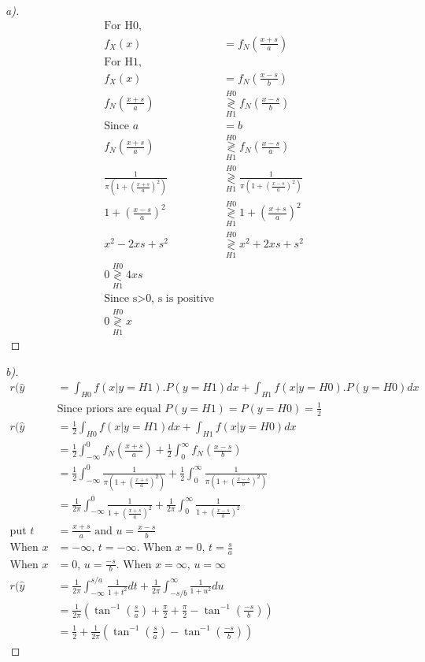 \documentclass[12pt]{article}
\newcommand\gldec[2]{
\underset{#1}{\overset{#2}{\gtrless}}
}
\newenvironment{theorem}[2][Theorem]{\begin{trivlist}
\item[\hskip \labelsep {\bfseries #1}\hskip \labelsep {\bfseries #2.}]}{\end{trivlist}}
\begin{document}
\begin{theorem}[Ans]{3}
\begin{proof}[a)]
\begin{align*}
\text{For H0,}\\
f_{X}(x) &= f_{N}(\frac{x+s}{a})\\
\text{For H1,}\\
f_{X}(x) &= f_{N}(\frac{x-s}{b})\\
f_{N}(\frac{x+s}{a}) & \gldec{H1}{H0} f_{N}(\frac{x-s}{b})\\
\text{Since }a&=b\\
f_{N}(\frac{x+s}{a}) & \gldec{H1}{H0} f_{N}(\frac{x-s}{a})\\
\frac{1}{\pi (1+(\frac{x+s}{a})^{2})} & \gldec{H1}{H0} \frac{1}{\pi (1+(\frac{x-s}{a})^{2})}\\
1+(\frac{x-s}{a})^2 & \gldec{H1}{H0} 1 + (\frac{x+s}{a})^{2}\\
x^{2}-2xs+s^{2} & \gldec{H1}{H0} x^{2}+2xs+s^{2} \\
0 \gldec{H1}{H0} 4xs\\
\text{Since s$>$0, s is positive}\\
0 \gldec{H1}{H0} x
\end{align*}
\end{proof}
\pagebreak
\begin{proof}[b)] 
\begin{align*}
r(\hat{y} &= \int_{H0}f(x|y=H1).P(y=H1)dx + \int_{H1}f(x|y=H0).P(y=H0)dx\\
&\text{Since priors are equal }P(y=H1) = P(y=H0) =\frac{1}{2}\\
r(\hat{y} &= \frac{1}{2}\int_{H0}f(x|y=H1)dx+ \int_{H1}f(x|y=H0)dx\\
&= \frac{1}{2} \int_{-\infty}^{0}f_{N}(\frac{x+s}{a}) + \frac{1}{2} \int_{0}^{\infty}f_{N}(\frac{x-s}{b})\\
&= \frac{1}{2}\int_{-\infty}^{0}\frac{1}{\pi (1+(\frac{x+s}{a})^{2})} +  \frac{1}{2}\int_{0}^{\infty}\frac{1}{\pi (1+(\frac{x-s}{b})^{2})}\\
&= \frac{1}{2\pi}\int_{-\infty}^{0}\frac{1}{1+(\frac{x+s}{a})^{2}} + \frac{1}{2\pi}\int_{0}^{\infty}\frac{1}{1+(\frac{x-s}{b})^{2}}\\
\text{put }t &= \frac{x+s}{a} \text{ and }u = \frac{x-s}{b}  \\
\text{When }x&=-\infty\text{,  } t = -\infty\text{. When } x=0 \text{,  }t=\frac{s}{a}\\
\text{When }x&=0\text{,  } u = \frac{-s}{b}\text{. When } x=\infty \text{,  }u=\infty\\
r(\hat{y}&=\frac{1}{2\pi}\int_{-\infty}^{s/a}\frac{1}{1+t^{2}}dt + \frac{1}{2\pi}\int_{-s/b}^{\infty}\frac{1}{1+u^{2}}du\\
&=\frac{1}{2\pi}(\tan^{-1}(\frac{s}{a})+\frac{\pi}{2} +\frac{\pi}{2} - \tan^{-1}(\frac{-s}{b}) )\\
&= \frac{1}{2}+\frac{1}{2\pi}(\tan^{-1}(\frac{s}{a})- \tan^{-1}(\frac{-s}{b}))
\end{align*}
\end{proof}
\end{theorem}
\end{document}
